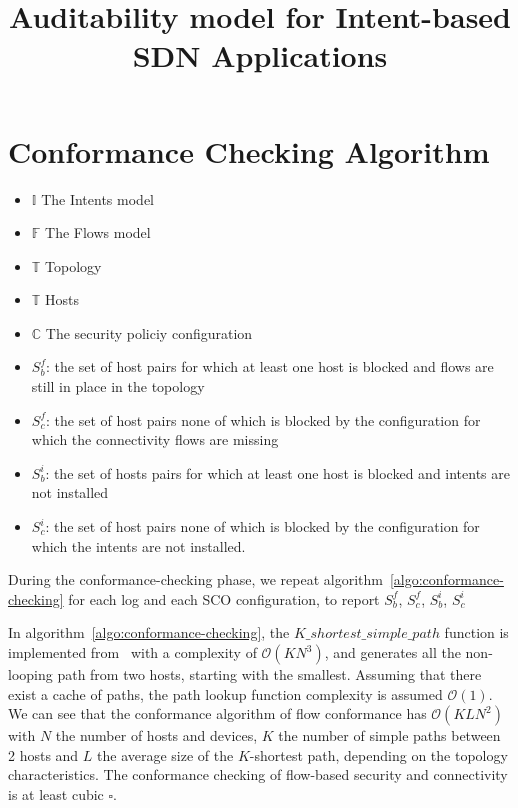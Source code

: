 \documentclass[conference]{IEEEtran}
\begin{document}
\title{Auditability model for Intent-based SDN Applications}


\author{ 
\and
{}
}


\maketitle

\section{Conformance Checking Algorithm}
 
\begin{itemize}
\item $\mathbb{I}$ The Intents model
\item $\mathbb{F}$ The Flows model
\item $\mathbb{T}$ Topology 
\item $\mathbb{T}$ Hosts
\item $\mathbb{C}$ The security policiy configuration
\item $S^f_b$: the set of host pairs for which at least one host is blocked and flows are still in place in the topology
\item $S^f_c$: the set of host pairs none of which is blocked by the configuration for which the connectivity flows are missing
\item $S^i_b$: the set of hosts pairs for which at least one host is blocked and intents are not installed 
\item $S^i_c$: the set of host pairs none of which is blocked by the configuration for which the intents are not installed.
\end{itemize}

During the conformance-checking phase, we repeat algorithm~\ref{algo:conformance-checking} for each log and each SCO configuration, to report $S^f_b$, $S^f_c$, $S^i_b$, $S^i_c$
 
In algorithm~\ref{algo:conformance-checking}, the $K\_shortest\_simple\_path$ function is implemented from~\cite{Yen1971} with a complexity of $\mathcal{O}(KN^3)$, and generates all the non-looping path from two hosts, starting with the smallest.
Assuming that there exist a cache of paths, the path lookup function complexity is assumed $\mathcal{O}(1)$.
We can see that the conformance algorithm of flow conformance has $\mathcal{O}(K L N^2 )$ with $N$ the number of hosts and devices, $K$ the number of simple paths between 2 hosts and $L$ the average size of the $K$-shortest path, depending on the topology characteristics. The conformance checking of flow-based security and connectivity is at least cubic $\square$.
\end{document}
